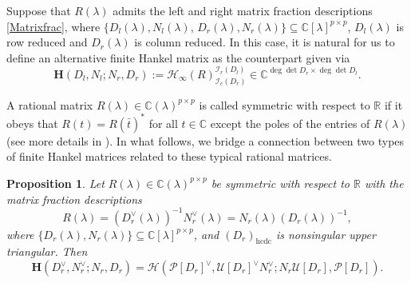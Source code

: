 \documentclass[12pt,reqno]{amsart}
\theoremstyle{plain}
\newtheorem{proposition}[theorem]{Proposition}
\numberwithin{equation}{section}
\theoremstyle{remark}
\begin{document}
Suppose that $R(\lambda)$ admits the left and right matrix fraction descriptions \eqref{Matrixfrac},
where $\{{D}_l(\lambda), {N}_l(\lambda)$, $D_r(\lambda), {N}_r(\lambda)\}\subseteq \mathbb C[\lambda]^{p\times p}$, ${D}_l(\lambda)$ is row reduced and ${D}_r(\lambda)$ is column reduced.
In this case, it is natural for us to define an alternative finite Hankel matrix as the counterpart given via 
$$
{\mathbf{H}}(D_l,N_l;N_r,D_r):=\mathscr{H}_{\infty}(R)^{\mathcal I_r(D_l)}_{\mathcal I_c(D_r)}\in \mathbb C^{\deg \det  D_r\times \deg \det D_l}.
$$
 

A rational matrix $R(\lambda)\in \mathbb C(\lambda)^{p\times p}$ is called symmetric with respect to $\mathbb R$ if it obeys that $R(t)=R(\bar t)^*$ for all $t\in\mathbb C$ except the poles of the entries of $R(\lambda)$ (see more details in \cite{DNQD}). 
In what follows, we bridge a connection between two types of finite Hankel matrices related to these typical rational matrices.







\begin{proposition}\label{ProHscrH}
Let $R(\lambda)\in \mathbb C(\lambda)^{p\times p}$ be symmetric with respect to $\mathbb R$ with the matrix fraction descriptions 
\begin{equation}\label{SymMatrixfrac}
R(\lambda)=(D_r^{\vee}(\lambda))^{-1}N_r^{\vee}(\lambda)=N_r(\lambda)(D_r(\lambda))^{-1},
\end{equation}
where $\{D_r(\lambda), N_r(\lambda)\}\subseteq \mathbb C[\lambda]^{p\times p}$, and $(D_r)_{\mathrm{hcdc}}$ is nonsingular upper triangular.
Then
\begin{equation*}
\mathbf{H}(D^{\vee}_r,N^{\vee}_r;N_r,D_r)=\mathscr{H}(\mathscr P[D_r]^{\vee},\mathscr U[D_r]^{\vee} N_r^{\vee};N_r \mathscr U[D_r],\mathscr P[D_r]).
\end{equation*}
\end{proposition}
\end{document}
